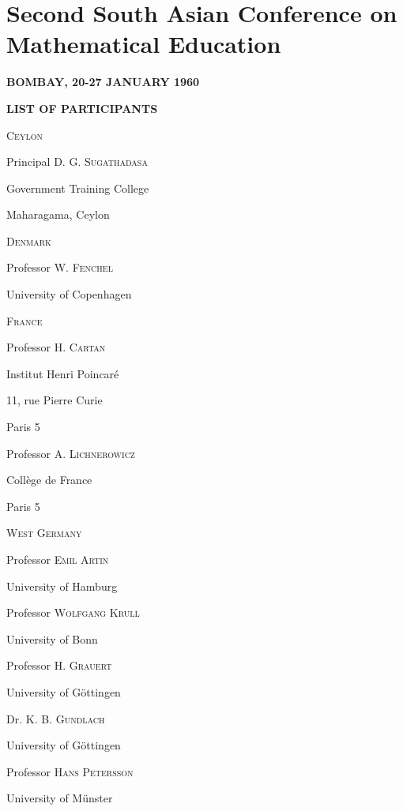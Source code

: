 
\chapter{Second South Asian Conference on Mathematical Education}

\begin{center}
\textbf{BOMBAY, 20-27 JANUARY 1960}

\bigskip
\textbf{\Large{LIST OF PARTICIPANTS}}
\end{center}

\noindent
\textsc{Ceylon}

\smallskip
Principal D. G. \textsc{Sugathadasa}

Government Training College

Maharagama, Ceylon

\noindent
\textsc{Denmark}

\smallskip
Professor W. \textsc{Fenchel}

University of Copenhagen

\noindent
\textsc{France}

\smallskip
Professor H. \textsc{Cartan}

Institut Henri Poincar\'e

11, rue Pierre Curie

Paris 5

\medskip

Professor A. \textsc{Lichnerowicz}

Coll\`ege de France

Paris 5

\medskip
\noindent
\textsc{West Germany}

\smallskip
Professor \textsc{Emil Artin}

University of Hamburg

\smallskip

Professor \textsc{Wolfgang Krull}

University of Bonn

\medskip

Professor H. \textsc{Grauert}

University of G\"ottingen

\medskip

Dr. K. B. \textsc{Gundlach}

University of G\"ottingen

\medskip

Professor \textsc{Hans Petersson}

University of M\"unster

\medskip

